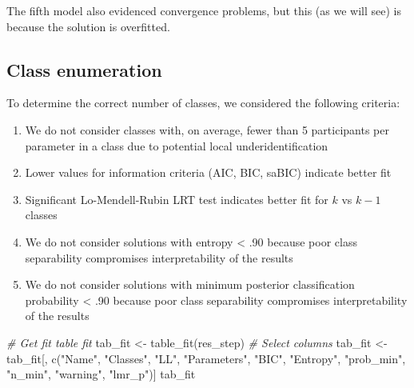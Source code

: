\documentclass[
  man,floatsintext]{apa6}
\newenvironment{Shaded}{\begin{snugshade}}{\end{snugshade}}
\newcommand{\CommentTok}[1]{\textcolor[rgb]{0.56,0.35,0.01}{\textit{#1}}}
\newcommand{\FunctionTok}[1]{\textcolor[rgb]{0.00,0.00,0.00}{#1}}
\newcommand{\NormalTok}[1]{#1}
\newcommand{\OtherTok}[1]{\textcolor[rgb]{0.56,0.35,0.01}{#1}}
\newcommand{\StringTok}[1]{\textcolor[rgb]{0.31,0.60,0.02}{#1}}
\providecommand{\tightlist}{%
  \setlength{\itemsep}{0pt}\setlength{\parskip}{0pt}}
\begin{document}
The fifth model also evidenced convergence problems, but this (as we will see) is because the solution is overfitted.

\hypertarget{class-enumeration}{%
\subsection{Class enumeration}\label{class-enumeration}}

To determine the correct number of classes, we considered the following criteria:

\begin{enumerate}
\def\labelenumi{\arabic{enumi}.}
\tightlist
\item
  We do not consider classes with, on average, fewer than 5 participants per parameter in a class due to potential local underidentification
\item
  Lower values for information criteria (AIC, BIC, saBIC) indicate better fit
\item
  Significant Lo-Mendell-Rubin LRT test indicates better fit for \(k\) vs \(k-1\) classes
\item
  We do not consider solutions with entropy \textless{} .90 because poor class separability compromises interpretability of the results
\item
  We do not consider solutions with minimum posterior classification probability \textless{} .90 because poor class separability compromises interpretability of the results
\end{enumerate}

\begin{Shaded}
\begin{Highlighting}[]
\CommentTok{\# Get fit table fit}
\NormalTok{tab\_fit }\OtherTok{\textless{}{-}} \FunctionTok{table\_fit}\NormalTok{(res\_step)}
\CommentTok{\# Select columns}
\NormalTok{tab\_fit }\OtherTok{\textless{}{-}}\NormalTok{ tab\_fit[, }\FunctionTok{c}\NormalTok{(}\StringTok{"Name"}\NormalTok{, }\StringTok{"Classes"}\NormalTok{, }\StringTok{"LL"}\NormalTok{, }\StringTok{"Parameters"}\NormalTok{,}
    \StringTok{"BIC"}\NormalTok{, }\StringTok{"Entropy"}\NormalTok{, }\StringTok{"prob\_min"}\NormalTok{, }\StringTok{"n\_min"}\NormalTok{, }\StringTok{"warning"}\NormalTok{, }\StringTok{"lmr\_p"}\NormalTok{)]}
\NormalTok{tab\_fit}
\end{Highlighting}
\end{Shaded}
\end{document}
